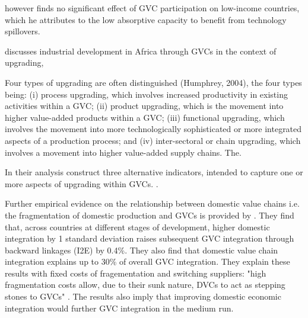 \documentclass[a4paper]{article}
\begin{document}
\citet{kummritz2015global} however finds no significant effect of GVC participation on low-income countries, which he attributes to the low absorptive capacity to benefit from technology spillovers. 



\citet{foster2015global} discusses industrial development in Africa through GVCs in the context of upgrading, 

Four types of upgrading are often distinguished (Humphrey, 2004), the four types being: (i) process upgrading, which involves increased productivity in existing activities within a GVC; (ii) product upgrading, which is the movement into higher value-added products within a GVC; (iii) functional upgrading, which involves the movement into more technologically sophisticated or more integrated aspects of a production process; and (iv) inter-sectoral or chain upgrading, which involves a movement into higher value-added supply chains. The.

In their analysis \citet{foster2015global} construct three alternative indicators, intended to capture one or more aspects of upgrading within GVCs. 
. 



Further empirical evidence on the relationship between domestic value chains i.e. the fragmentation of domestic production and GVCs is provided by \citet{beverelli2019domestic}. They find that, across countries at different stages of development, higher domestic integration by 1 standard deviation raises subsequent GVC integration through backward linkages (I2E) by 0.4\%. They also find that domestic value chain integration explains up to 30\% of overall GVC integration. They explain these results with fixed costs of fragementation and switching suppliers: "high fragmentation costs allow, due to their sunk nature, DVCs to act as stepping stones to GVCs" \citep{beverelli2019domestic}. The results also imply that improving domestic economic integration would further GVC integration in the medium run. 
\end{document}
